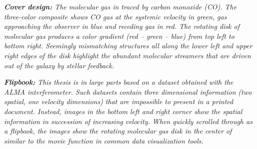 \thispagestyle{empty}







\hfill
\vfill
\noindent

\textit{\textbf{Cover design:} 
The molecular gas in  traced by carbon monoxide (CO). The three-color composite shows CO gas at the systemic velocity in green, gas approaching the observer in blue and receding gas in red. The rotating disk of molecular gas produces a color gradient (red -- green -- blue) from top left to bottom right. Seemingly mismatching structures all along the lower left and upper right edges of the disk highlight the abundant molecular streamers that are driven out of the galaxy by stellar feedback.
}

\vspace{1cm}
\textit{\textbf{Flipbook:}
This thesis is in large parts based on a dataset obtained with the ALMA interferometer. Such datasets contain three dimensional information (two spatial, one velocity dimensions) that are impossible to present in a printed document. Instead, images in the bottom left and right corner show the spatial information in succession of increasing velocity. When quickly scrolled through as a flipbook, the images show the rotating molecular gas disk in the center of  similar to the movie function in common data visualization tools.
}